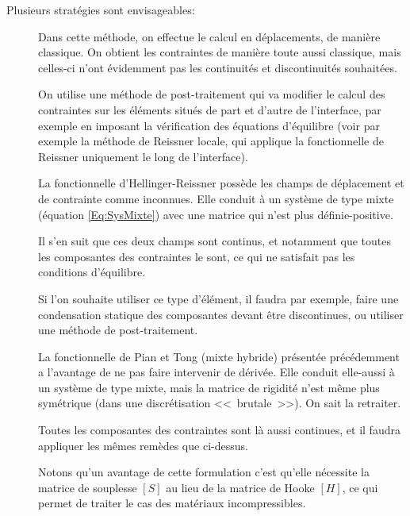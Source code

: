 \bigskip
Plusieurs stratégies sont envisageables:
\begin{description}
\item[]

	Dans cette méthode, on effectue le calcul en déplacements, de manière classique.
	On obtient les contraintes de manière toute aussi classique, mais celles-ci
	n'ont évidemment pas les continuités et discontinuités souhaitées.

	On utilise une méthode de post-traitement qui va modifier le calcul des contraintes
	sur les éléments situés de part et d'autre de l'interface, par exemple
	en imposant la vérification des équations d'équilibre (voir par exemple
	la méthode de Reissner locale, qui applique la fonctionnelle de Reissner uniquement
	le long de l'interface).
\item[]

	La fonctionnelle d'Hellinger-Reissner
	possède les champs de déplacement et de
	contrainte comme inconnues. Elle conduit à un système de type mixte
	(équation \eqref{Eq:SysMixte}) avec une matrice qui n'est plus définie-positive.

	Il s'en suit que ces deux champs sont continus, et notamment que toutes les
	composantes des contraintes le sont, ce qui ne satisfait pas les conditions
	d'équilibre.

	Si l'on souhaite utiliser ce type d'élément, il faudra par exemple, faire une
	condensation statique des composantes devant être discontinues, ou
	utiliser une méthode de post-traitement.
\item[]

	La fonctionnelle de Pian et Tong (mixte hybride)
	présentée précédemment
	a l'avantage de ne pas faire intervenir de dérivée. Elle conduit elle-aussi
	à un système de type mixte, mais la matrice de rigidité n'est même
	plus symétrique (dans une discrétisation <<~brutale~>>). On sait la retraiter.

	Toutes les composantes des contraintes sont là aussi continues, et il faudra appliquer les
	mêmes remèdes que ci-dessus.

	Notons qu'un avantage de cette formulation c'est qu'elle nécessite la matrice
	de souplesse $[S]$ au lieu de la matrice de Hooke $[H]$, ce qui permet de
	traiter le cas des matériaux incompressibles.
\item[]
	

\end{description}
